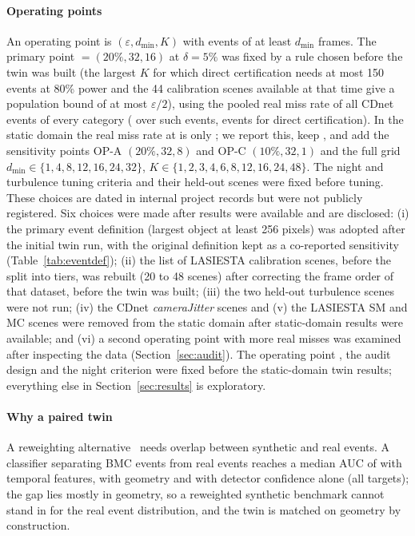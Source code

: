\paragraph{Operating points} An operating point is $(\varepsilon,d_{\min},K)$ with events of at least $d_{\min}$
frames. The primary point \OPs{} $=(20\%, 32, 16)$ at $\delta=5\%$ was fixed by a rule chosen before the twin was built
(the largest $K$ for which direct certification needs at most 150 events at 80\% power and the 44 calibration scenes
available at that time give a population bound of at most $\varepsilon/2$), using the pooled real miss rate of all
CDnet events of every category (\nOldPhat{} over \nOldN{} such events, \nOldNreq{} events for direct certification). In the static domain the real miss rate at \OPs{} is only
\nPmainOP; we report this, keep \OPs, and add the sensitivity points OP-A $(20\%,32,8)$ and OP-C $(10\%,32,1)$ and the
full grid $d_{\min}\in\{1,4,8,12,16,24,32\}$, $K\in\{1,2,3,4,6,8,12,16,24,48\}$. The night and turbulence tuning criteria and their held-out
scenes were fixed before tuning. These choices are dated in internal project records but were not publicly registered.
Six choices were made after results were available and are disclosed: (i) the primary event definition (largest
object at least 256 pixels) was adopted after the initial twin run, with the original definition kept as a co-reported
sensitivity (Table~\ref{tab:eventdef}); (ii) the list of LASIESTA calibration scenes, before the split into tiers, was rebuilt (20 to 48 scenes) after correcting
the frame order of that dataset, before the twin was built; (iii) the two held-out turbulence scenes were not run;
(iv) the CDnet \emph{cameraJitter} scenes and (v) the LASIESTA SM and MC scenes were removed from the static domain
after static-domain results were available; and (vi) a second operating point with more real misses was examined after
inspecting the data (Section~\ref{sec:audit}). The operating point \OPs, the audit design and the night criterion were
fixed before the static-domain twin results; everything else in Section~\ref{sec:results} is exploratory.

\paragraph{Why a paired twin} A reweighting alternative~\cite{shimodaira2000} needs overlap between synthetic and real
events. A classifier separating BMC events from real events reaches a median AUC of \nIWtemporal{} with temporal
features, \nIWgeometry{} with geometry and \nIWappearance{} with detector confidence alone (all targets); the gap lies
mostly in geometry, so a reweighted synthetic benchmark cannot stand in for the real event distribution, and the twin
is matched on geometry by construction.

